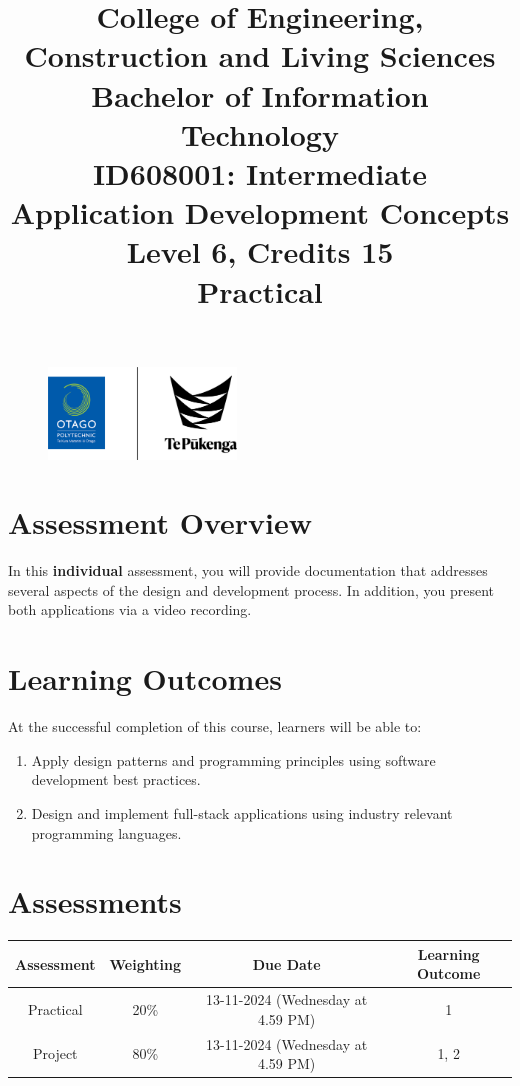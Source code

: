 \documentclass{article}
\author{}
\begin{document}
\begin{figure}
	\centering
	\includegraphics[width=50mm]{../../../resources/img/logo.png}
\end{figure}

\title{College of Engineering, Construction and Living Sciences\\Bachelor of Information Technology\\ID608001: Intermediate Application Development Concepts\\Level 6, Credits 15\\\textbf{Practical}}
\date{}
\maketitle

\section*{Assessment Overview}
In this \textbf{individual} assessment, you will provide documentation that addresses several aspects of the design and development process. In addition, you present both applications via a video recording. 

\section*{Learning Outcomes}
At the successful completion of this course, learners will be able to:
\begin{enumerate}
	\item Apply design patterns and programming principles using software development best practices.
	\item Design and implement full-stack applications using industry relevant programming languages.
\end{enumerate}

\section*{Assessments} 
\renewcommand{\arraystretch}{1.5}
\begin{tabular}{|c|c|c|c|}
	\hline 
	\textbf{Assessment}                                 & \textbf{Weighting} & \textbf{Due Date}            & \textbf{Learning Outcome} \\ \hline
	\small Practical & \small 20\%        & \small 13-11-2024 (Wednesday at 4.59 PM)   & \small 1                   \\ \hline
	\small Project                 & \small 80\%        & \small 13-11-2024 (Wednesday at 4.59 PM) \small  & \small 1, 2                   \\ \hline
\end{tabular}
\end{document}
